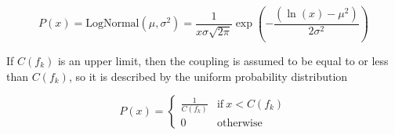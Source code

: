 \begin{equation}
	P(x) = \mathrm{LogNormal}(\mu, \sigma^2) = \frac{1}{x \sigma \sqrt{2\pi}} \exp(-\frac{(\ln(x) - \mu^2)}{2 \sigma^2})
\end{equation}

If $C(f_k)$ is an upper limit, then the coupling is assumed to be equal to or less than $C(f_k)$, so it is described by the uniform probability distribution

\begin{equation}
	P(x) =
		\begin{cases}
      \frac{1}{C(f_k)} & \text{if}\ x < C(f_k)\\
      0 & \text{otherwise}
    \end{cases}
\end{equation}
